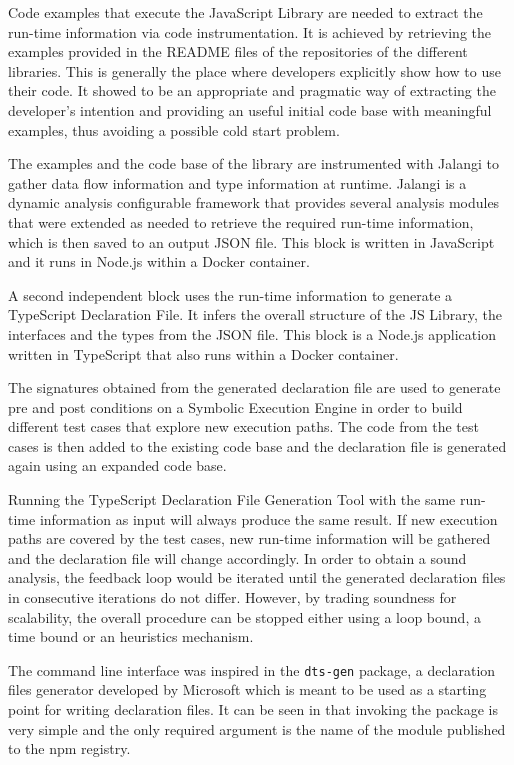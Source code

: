 Code examples that execute the JavaScript Library are needed to extract the run-time information via code instrumentation. It is achieved by retrieving the examples provided in the README files of the repositories of the different libraries. This is generally the place where developers explicitly show how to use their code. It showed to be an appropriate and pragmatic way of extracting the developer's intention and providing an useful initial code base with meaningful examples, thus avoiding a possible cold start problem. 

The examples and the code base of the library are instrumented with Jalangi \citep{DBLP:conf/sigsoft/SenKBG13}\citep{DBLP:conf/sigsoft/SenKBG13a} to gather data flow information and type information at runtime. Jalangi is a dynamic analysis configurable framework that provides several analysis modules that were extended as needed to retrieve the required run-time information, which is then saved to an output JSON file. This block is written in JavaScript and it runs in Node.js within a Docker container.

A second independent block uses the run-time information to generate a TypeScript Declaration File. It infers the overall structure of the JS Library, the interfaces and the types from the JSON file. This block is a Node.js application written in TypeScript that also runs within a Docker container.

The signatures obtained from the generated declaration file are used to generate pre and post conditions on a Symbolic Execution Engine in order to build different test cases that explore new execution paths. The code from the test cases is then added to the existing code base and the declaration file is generated again using an expanded code base.

Running the TypeScript Declaration File Generation Tool with the same run-time information as input will always produce the same result. If new execution paths are covered by the test cases, new run-time information will be gathered and the declaration file will change accordingly. In order to obtain a sound analysis, the feedback loop would be iterated until the generated declaration files in consecutive iterations do not differ. However, by trading soundness for scalability, the overall procedure can be stopped either using a loop bound, a time bound or an heuristics mechanism. 

The command line interface was inspired in the \texttt{dts-gen} \citep{dts-gen} package, a declaration files generator developed by Microsoft which is meant to be used as a starting point for writing declaration files. It can be seen in  that invoking the package is very simple and the only required argument is the name of the module published to the npm registry.

